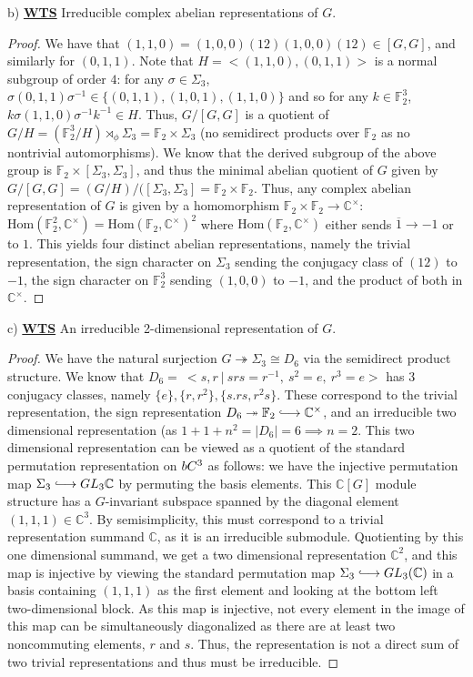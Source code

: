 \documentclass{article}
\newcommand{\Hom}{\text{Hom}}
\newcommand{\bb}[1]{\mathbb{#1}}
\newcommand{\iso}{\cong}
\newcommand{\into}{\lhook\joinrel\longrightarrow}
\newcommand{\onto}{\twoheadrightarrow}
\begin{document}
b) \textbf{\underline{WTS}} Irreducible complex abelian representations of $G$.
\begin{proof}
  We have that $(1,1,0) = (1,0,0)(12)(1,0,0)(12) \in [G,G]$, and similarly for $(0,1,1)$. Note that $H = <(1,1,0), (0,1,1)>$ is a normal subgroup of order $4$: for any $\sigma \in \Sigma_{3}$, $\sigma(0,1,1)\sigma^{-1} \in \{(0,1,1), (1,0,1), (1,1,0)\}$ and so for any $k \in \bb{F}_{2}^{3}$, $k\sigma (1,1,0) \sigma^{-1} k^{-1} \in  H$. Thus, $G/[G,G]$ is a quotient of $G/H = (\bb{F}_{2}^{3}/H) \rtimes_{\phi} \Sigma_{3} = \bb{F}_{2} \times \Sigma_{3}$ (no semidirect products over $\bb{F}_{2}$ as no nontrivial automorphisms). We know that the derived subgroup of the above group is $\bb{F}_{2} \times [\Sigma_{3},\Sigma_{3}]$, and thus the minimal abelian quotient of $G$ given by $G/[G,G] = (G/H)/([\Sigma_{3},\Sigma_{3}] = \bb{F}_{2} \times \bb{F}_{2}$. Thus, any complex abelian representation of $G$ is given by a homomorphism $\bb{F}_{2} \times \bb{F}_{2} \to \bb{C}^{\times}$: $\Hom(\bb{F}_{2}^{2}, \bb{C}^{\times}) = \Hom(\bb{F}_{2},\bb{C}^{\times})^{2}$ where $\Hom(\bb{F}_{2}, \bb{C}^{\times})$ either sends $\overline 1 \to -1$ or to $1$. This yields four distinct abelian representations, namely the trivial representation, the sign character on $\Sigma_{3}$ sending the conjugacy class of $(12)$ to $-1$, the sign character on $\bb{F}_{2}^{3}$ sending  $(1,0,0)$ to $-1$, and the product of both in $\bb{C}^{\times}$.     
\end{proof}

c) \textbf{\underline{WTS}} An irreducible 2-dimensional representation of $G$.
\begin{proof}
  We have the natural surjection $G \onto \Sigma_{3} \iso D_{6}$ via the semidirect product structure. We know that $D_{6} = \ < s, r \ | \ srs = r^{-1}, \ s^{2} = e, \ r^{3} = e > $ has 3 conjugacy classes, namely $\{e\}, \{r, r^{2}\}, \{s. rs, r^{2}s\}$. These correspond to the trivial representation, the sign representation $D_{6} \onto \bb{F}_{2} \into \bb{C}^{\times}$, and an irreducible two dimensional representation (as $1+1+n^{2} = |D_{6}| = 6 \implies n = 2$. This two dimensional representation can be viewed as a quotient of the standard permutation representation on $\\b{C}^{3}$ as follows: we have the injective permutation map $\Sigma_{3} \into GL_{3}\bb{C}$ by permuting the basis elements. This $\bb{C}[G]$ module structure has a $G$-invariant subspace spanned by the diagonal element $(1,1,1) \in \bb{C}^{3}$. By semisimplicity, this must correspond to a trivial representation summand $\bb{C}$, as it is an irreducible submodule. Quotienting by this one dimensional summand, we get a two dimensional representation $\bb{C}^{2}$, and this map is injective by viewing the standard permutation map $\Sigma_{3} \into GL_{3}(\bb{C})$ in a basis containing $(1,1,1)$ as the first element and looking at the bottom left two-dimensional block. As this map is injective, not every element in the image of this map can be simultaneously diagonalized as there are at least two noncommuting elements, $r$ and $s$. Thus, the representation is not a direct sum of two trivial representations and thus must be irreducible. 
\end{proof}
\end{document}
